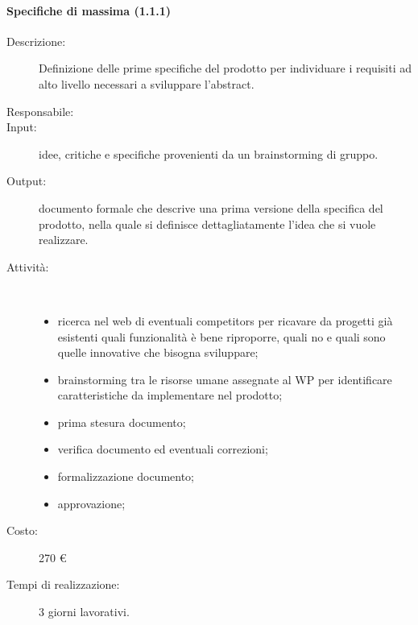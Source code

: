 \paragraph{Specifiche di massima (1.1.1)}
\begin{description}
\item[Descrizione:] Definizione delle prime specifiche del prodotto per individuare i requisiti ad alto livello necessari a sviluppare l'abstract.
\item[Responsabile:]
\item[Input:] idee, critiche e specifiche provenienti da un brainstorming di gruppo.
\item[Output:] documento formale che descrive una prima versione della specifica del prodotto, nella quale si definisce dettagliatamente l'idea che si vuole realizzare.
\item[Attività:]\mbox{}\\[-1.5\baselineskip]
	\begin{itemize}
	\item ricerca nel web di eventuali competitors per ricavare da progetti già esistenti quali funzionalità è bene riproporre, quali no e quali sono quelle innovative che bisogna sviluppare;
	\item brainstorming tra le risorse umane assegnate al WP per identificare caratteristiche da implementare nel prodotto;
	\item prima stesura documento;
	\item verifica documento ed eventuali correzioni;
	\item formalizzazione documento;
	\item approvazione;
	\end{itemize}
\item[Costo:] 270 \euro{}
\item[Tempi di realizzazione:] 3 giorni lavorativi.
\end{description}


